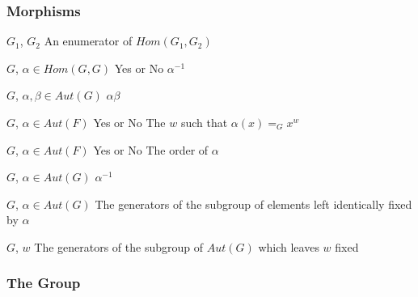 \subsubsection{Morphisms}

\begin{enumerate}

{$G_1$, $G_2$}
{An enumerator of $Hom(G_1,G_2)$}

{$G$, $\alpha\in Hom(G,G)$}
{Yes or No}
{$\alpha^{-1}$}

{$G$, $\alpha, \beta\in Aut(G)$}
{$\alpha\beta$}

{$G$, $\alpha\in Aut(F)$}
{Yes or No}
{The $w$ such that $\alpha(x)=_G x^w$}

{$G$, $\alpha\in Aut(F)$}
{Yes or No}
{The order of $\alpha$}

{$G$, $\alpha\in Aut(G)$}
{$\alpha^{-1}$}

{$G$, $\alpha\in Aut(G)$}
{The generators of the subgroup of elements left
identically fixed by $\alpha$
}

{$G$, $w$}
{The generators of the subgroup of $Aut(G)$ which leaves $w$ fixed}

\end{enumerate}


\subsubsection{The Group}

